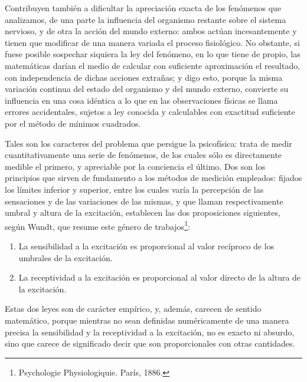 \documentclass[a4paper, 12pt]{article}
\begin{document}
Contribuyen también a dificultar la apreciación exacta de los fenómenos que analizamos, de una parte la influencia del organismo restante sobre el sistema nervioso, y de otra la acción del mundo externo: ambos actúan incesantemente y tienen que modificar de una manera variada el proceso fisiológico. No obstante, si fuese posible sospechar siquiera la ley del fenómeno, en lo que tiene de propio, las matemáticas darían el medio de calcular con suficiente aproximación el resultado, con independencia de dichas acciones extrañas; y digo esto, porque la misma variación continua del estado del organismo y del mundo externo, convierte su influencia en una cosa idéntica a lo que en las observaciones físicas se llama errores accidentales, sujetos a ley conocida y calculables con exactitud suficiente por el método de mínimos cuadrados.

Tales son los caracteres del problema que persigue la psicofísica: trata de medir cuantitativamente una serie de fenómenos, de los cuales sólo es directamente medible el primero, y apreciable por la conciencia el último. Dos son los principios que sirven de fundamento a los métodos de medición empleados: fijados los límites inferior y superior, entre los cuales varía la percepción de las sensaciones y de las variaciones de las mismas, y que llaman respectivamente umbral y altura de la excitación, establecen las dos proposiciones siguientes, según Wundt, que resume este género de trabajos\footnote{Psychologie Physiologiquie. París, 1886.}:

\begin{enumerate}

\item  La sensibilidad a la excitación es proporcional al valor recíproco de los umbrales de la excitación.

\item  La receptividad a la excitación es proporcional al valor directo de la altura de la excitación.

\end{enumerate}

Estas dos leyes son de carácter empírico, y, además, carecen de sentido matemático, porque mientras no sean definidas numéricamente de una manera precisa la sensibilidad y la receptividad a la excitación, no es exacto ni absurdo, sino que carece de significado decir que son proporcionales con otras cantidades.
\end{document}
